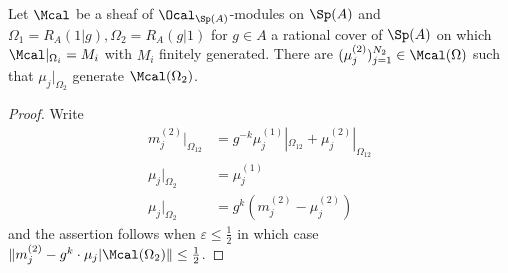\begin{corollary}\label{corr: generate restriction to Omega2}
    Let $\Mcal$ be a sheaf of $\Ocal_{\Sp(A)}$-modules on $\Sp(A)$ and $\Omega_{1}=R_{A}(1|g),\Omega_{2}=R_{A}(g|1)$ for $g\in A$ a rational cover of $\Sp(A)$ on which $\Mcal|_{\Omega_{i}}=M_{i}$ with $M_{i}$ finitely generated. There are $(\mu_{j}^{(2)})_{j=1}^{N_{2}}\in\Mcal(\Omega)$ such that $\mu_{j}|_{\Omega_{2}}$ generate $\Mcal(\Omega_{2})$. 
\end{corollary}
\begin{proof}
    Write 
    \begin{align*}
        m_{j}^{(2)}|_{\Omega_{12}} &= g^{-k}\mu_{j}^{(1)}|_{\Omega_{12}} + \mu_{j}^{(2)}|_{\Omega_{12}} \\
        \mu_{j}|_{\Omega_{2}}&=\mu_{j}^{(1)} \\
        \mu_{j}|_{\Omega_{2}}&= g^{k}(m_{j}^{(2)}-\mu_{j}^{(2)})
    \end{align*}
    and the assertion follows when $\varepsilon\leq\frac{1}{2}$ in which case $\Vert m_{j}^{(2)} - g^{k}\cdot \mu_{j}|\Mcal(\Omega_{2})\Vert\leq\frac{1}{2}$. 
\end{proof}
